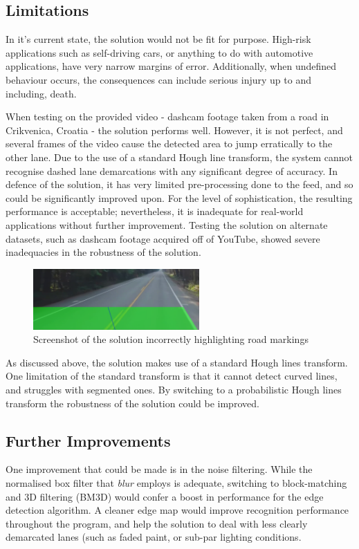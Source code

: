 \documentclass[conference]{IEEEtran}
\begin{document}
\subsection{Limitations}\label{sec:t2_lim}
In it's current state, the solution would not be fit for purpose. High-risk applications such as self-driving cars, or anything to do with automotive applications, have very narrow margins of error. Additionally, when undefined behaviour occurs, the consequences can include serious injury up to and including, death.

When testing on the provided video - dashcam footage taken from a road in Crikvenica, Croatia - the solution performs well. However, it is not perfect, and several frames of the video cause the detected area to jump erratically to the other lane. Due to the use of a standard Hough line transform, the system cannot recognise dashed lane demarcations with any significant degree of accuracy. In defence of the solution, it has very limited pre-processing done to the feed, and so could be significantly improved upon. For the level of sophistication, the resulting performance is acceptable; nevertheless, it is inadequate for real-world applications without further improvement. Testing the solution on alternate datasets, such as dashcam footage acquired off of YouTube\cite{SecondVideo}, showed severe inadequacies in the robustness of the solution.

\begin{figure}[H]
\centering
\includegraphics[width=2.5in]{video2_screenshot}
\caption{Screenshot of the solution incorrectly highlighting road markings}
\label{fig:t5working}
\end{figure}

As discussed above, the solution makes use of a standard Hough lines transform. One limitation of the standard transform is that it cannot detect curved lines, and struggles with segmented ones. By switching to a probabilistic Hough lines transform the robustness of the solution could be improved.
\subsection{Further Improvements}
One improvement that could be made is in the noise filtering. While the normalised box filter that \textit{blur} employs is adequate, switching to block-matching and 3D filtering (BM3D) would confer a boost in performance for the edge detection algorithm\cite{Blur}. A cleaner edge map would improve recognition performance throughout the program, and help the solution to deal with less clearly demarcated lanes (such as faded paint, or sub-par lighting conditions.
\end{document}
